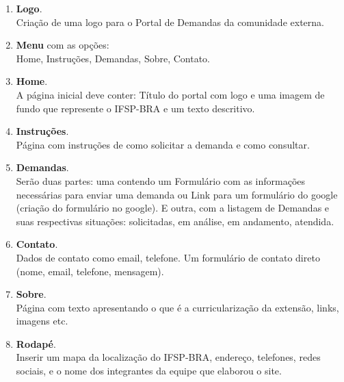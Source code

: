 \justify

\begin{enumerate}
    \item \textbf{Logo}. \\Criação de uma logo para o Portal de Demandas da comunidade externa.  
    \item \textbf{Menu} com as opções: \\ Home, Instruções, Demandas, Sobre, Contato.
    \item \textbf{Home}. \\A página inicial deve conter: Título do portal com logo e uma imagem de fundo que represente o IFSP-BRA e um texto descritivo.
    \item \textbf{Instruções}. \\Página com instruções de como solicitar a demanda e como consultar.
    \item \textbf{Demandas}. \\Serão duas partes: uma contendo um Formulário com as informações necessárias para enviar uma demanda ou Link para um formulário do google (criação do formulário no google). E outra, com a listagem de Demandas e suas respectivas situações: solicitadas, em análise, em andamento, atendida.
    \item \textbf{Contato}. \\Dados de contato como email, telefone. Um formulário de contato direto (nome, email, telefone, mensagem).
    \item \textbf{Sobre}. \\Página com texto apresentando o que é a curricularização da extensão, links, imagens etc. 
    \item \textbf{Rodapé}. \\Inserir um mapa da localização do IFSP-BRA, endereço, telefones, redes sociais, e o nome dos integrantes da equipe que elaborou o site.
\end{enumerate}
